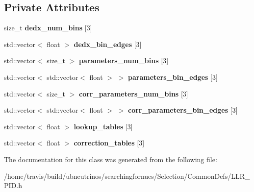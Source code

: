 \subsection*{Private Attributes}
\begin{DoxyCompactItemize}
\item 
size\+\_\+t {\bfseries dedx\+\_\+num\+\_\+bins} \mbox{[}3\mbox{]}\hypertarget{classsearchingfornues_1_1LLRPID_aa7d6cc52226bd9b52c83605c28bff6ea}{}\label{classsearchingfornues_1_1LLRPID_aa7d6cc52226bd9b52c83605c28bff6ea}

\item 
std\+::vector$<$ float $>$ {\bfseries dedx\+\_\+bin\+\_\+edges} \mbox{[}3\mbox{]}\hypertarget{classsearchingfornues_1_1LLRPID_a7737c601081b0794bf10639b073736ea}{}\label{classsearchingfornues_1_1LLRPID_a7737c601081b0794bf10639b073736ea}

\item 
std\+::vector$<$ size\+\_\+t $>$ {\bfseries parameters\+\_\+num\+\_\+bins} \mbox{[}3\mbox{]}\hypertarget{classsearchingfornues_1_1LLRPID_a16cf6fb36071fd876bb6d0fade4141f9}{}\label{classsearchingfornues_1_1LLRPID_a16cf6fb36071fd876bb6d0fade4141f9}

\item 
std\+::vector$<$ std\+::vector$<$ float $>$ $>$ {\bfseries parameters\+\_\+bin\+\_\+edges} \mbox{[}3\mbox{]}\hypertarget{classsearchingfornues_1_1LLRPID_a5fbeb32743ce2b01d944ceaf19086bb5}{}\label{classsearchingfornues_1_1LLRPID_a5fbeb32743ce2b01d944ceaf19086bb5}

\item 
std\+::vector$<$ size\+\_\+t $>$ {\bfseries corr\+\_\+parameters\+\_\+num\+\_\+bins} \mbox{[}3\mbox{]}\hypertarget{classsearchingfornues_1_1LLRPID_adeb273216e59a6a52482bdd8d5aaabfb}{}\label{classsearchingfornues_1_1LLRPID_adeb273216e59a6a52482bdd8d5aaabfb}

\item 
std\+::vector$<$ std\+::vector$<$ float $>$ $>$ {\bfseries corr\+\_\+parameters\+\_\+bin\+\_\+edges} \mbox{[}3\mbox{]}\hypertarget{classsearchingfornues_1_1LLRPID_a828bf2cee6250e9b0bf9278fa914d6ef}{}\label{classsearchingfornues_1_1LLRPID_a828bf2cee6250e9b0bf9278fa914d6ef}

\item 
std\+::vector$<$ float $>$ {\bfseries lookup\+\_\+tables} \mbox{[}3\mbox{]}\hypertarget{classsearchingfornues_1_1LLRPID_a33cb1049caaa153b9bc181983e89d7ea}{}\label{classsearchingfornues_1_1LLRPID_a33cb1049caaa153b9bc181983e89d7ea}

\item 
std\+::vector$<$ float $>$ {\bfseries correction\+\_\+tables} \mbox{[}3\mbox{]}\hypertarget{classsearchingfornues_1_1LLRPID_a2f1bfbcd22dfd1b47d2bde8407eebc90}{}\label{classsearchingfornues_1_1LLRPID_a2f1bfbcd22dfd1b47d2bde8407eebc90}

\end{DoxyCompactItemize}


The documentation for this class was generated from the following file\+:\begin{DoxyCompactItemize}
\item 
/home/travis/build/ubneutrinos/searchingfornues/\+Selection/\+Common\+Defs/L\+L\+R\+\_\+\+P\+I\+D.\+h\end{DoxyCompactItemize}
